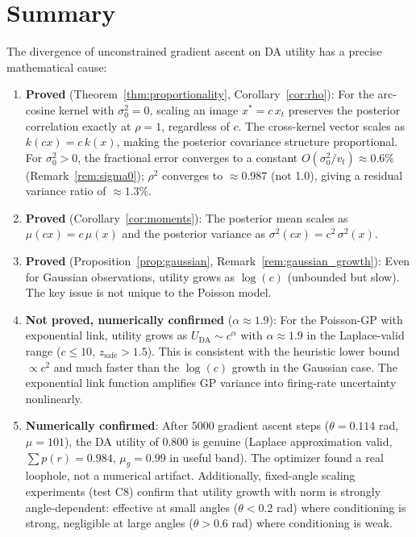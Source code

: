 \documentclass[11pt]{article}
\begin{document}
\section{Summary}

The divergence of unconstrained gradient ascent on DA utility has a precise
mathematical cause:

\begin{enumerate}
    \item \textbf{Proved} (Theorem~\ref{thm:proportionality}, Corollary~\ref{cor:rho}):
    For the arc-cosine kernel with $\sigma_0^2 = 0$, scaling an image
    $x^* = c \, x_t$ preserves the posterior correlation exactly at $\rho = 1$,
    regardless of $c$. The cross-kernel vector scales as $k(cx) = c \, k(x)$,
    making the posterior covariance structure proportional.
    For $\sigma_0^2 > 0$, the fractional error converges to a constant
    $O(\sigma_0^2/v_t) \approx 0.6\%$ (Remark~\ref{rem:sigma0});
    $\rho^2$ converges to $\approx 0.987$ (not 1.0), giving a residual
    variance ratio of $\approx 1.3\%$.

    \item \textbf{Proved} (Corollary~\ref{cor:moments}):
    The posterior mean scales as $\mu(cx) = c \, \mu(x)$ and the posterior
    variance as $\sigma^2(cx) = c^2 \, \sigma^2(x)$.

    \item \textbf{Proved} (Proposition~\ref{prop:gaussian}, Remark~\ref{rem:gaussian_growth}):
    Even for Gaussian observations, utility grows as $\log(c)$
    (unbounded but slow). The key issue is not unique to the Poisson model.

    \item \textbf{Not proved, numerically confirmed} ($\alpha \approx 1.9$):
    For the Poisson-GP with exponential link, utility grows as
    $U_{\text{DA}} \sim c^\alpha$ with $\alpha \approx 1.9$ in the
    Laplace-valid range ($c \leq 10$, $z_{\text{safe}} > 1.5$).
    This is consistent with the heuristic lower bound $\propto c^2$
    and much faster than the $\log(c)$ growth in the Gaussian case.
    The exponential link function amplifies GP variance into
    firing-rate uncertainty nonlinearly.

    \item \textbf{Numerically confirmed}:
    After 5000 gradient ascent steps ($\theta = 0.114$ rad, $\mu = 101$),
    the DA utility of 0.800 is genuine (Laplace approximation valid,
    $\sum p(r) = 0.984$, $\mu_g = 0.99$ in useful band).
    The optimizer found a real loophole, not a numerical artifact.
    Additionally, fixed-angle scaling experiments (test C8) confirm that
    utility growth with norm is strongly angle-dependent: effective at
    small angles ($\theta < 0.2$ rad) where conditioning is strong,
    negligible at large angles ($\theta > 0.6$ rad) where conditioning
    is weak.
\end{enumerate}
\end{document}
